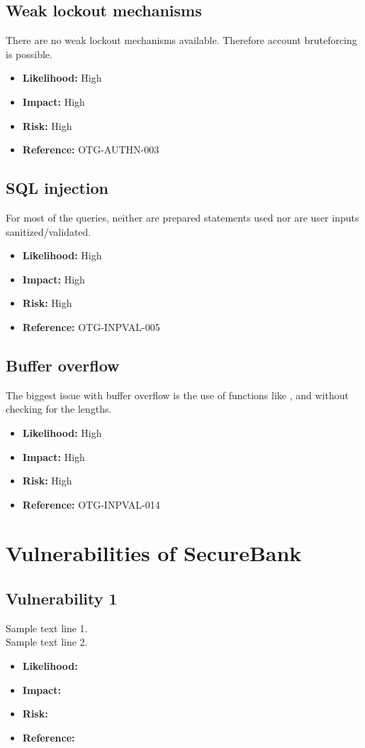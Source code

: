 \subsection{Weak lockout mechanisms}
There are no weak lockout mechanisms available. Therefore account bruteforcing is possible.
\begin{itemize}
	\item \textbf{Likelihood:} High
	\item \textbf{Impact:} High
	\item \textbf{Risk:} High
	\item \textbf{Reference:} OTG-AUTHN-003
\end{itemize}

\subsection{SQL injection}
For most of the queries, neither are prepared statements used nor are user inputs sanitized/validated.
\begin{itemize}
	\item \textbf{Likelihood:} High
	\item \textbf{Impact:} High
	\item \textbf{Risk:} High
	\item \textbf{Reference:} OTG-INPVAL-005
\end{itemize}

\subsection{Buffer overflow}
The biggest issue with buffer overflow is the use of functions like ,  and  without checking for the lengths.
\begin{itemize}
	\item \textbf{Likelihood:} High
	\item \textbf{Impact:} High
	\item \textbf{Risk:} High
	\item \textbf{Reference:} OTG-INPVAL-014
\end{itemize}

\section{Vulnerabilities of SecureBank}

\subsection{Vulnerability 1}
Sample text line 1.\\
Sample text line 2.\\
\begin{itemize}
	\item \textbf{Likelihood:}
	\item \textbf{Impact:}
	\item \textbf{Risk:}
	\item \textbf{Reference:}
\end{itemize}